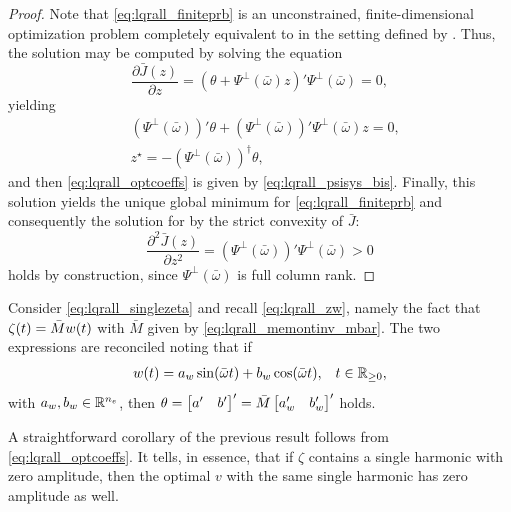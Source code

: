 \begin{proof}
	Note that \eqref{eq:lqrall_finiteprb} is an unconstrained, finite-dimensional optimization problem completely equivalent to  in the setting defined by . Thus, the solution may be computed by solving the equation
	\begin{equation}
		\frac{\partial\bar{J}(z)}{\partial z} = \left(\theta + \Psi^{\perp}(\bar{\omega})z \right)'\Psi^{\perp}(\bar{\omega}) = 0,
	\end{equation}
	yielding
	\begin{align}
		 & \left(\Psi^{\perp}(\bar{\omega}) \right)'\theta + \left(\Psi^{\perp}(\bar{\omega}) \right)'\Psi^{\perp}(\bar{\omega})z = 0, \\
		 & z^\star = -\left(\Psi^{\perp}(\bar{\omega}) \right)^\dagger \theta,
	\end{align}
	and then \eqref{eq:lqrall_optcoeffs} is given by \eqref{eq:lqrall_psisys_bis}.
	Finally, this solution yields the unique global minimum for \eqref{eq:lqrall_finiteprb} and consequently the solution for  by the strict convexity of $\bar{J}$:
	\begin{equation}
		\frac{\partial^2\bar{J}(z)}{\partial z^2} = (\Psi^{\perp}(\bar{\omega}))'\Psi^{\perp}(\bar{\omega}) > 0
	\end{equation}
	holds by construction, since $\Psi^{\perp}(\bar{\omega})$ is full column rank.
\end{proof}

\begin{remark}
	\label{rmk:lqrall_mbar}
	Consider \eqref{eq:lqrall_singlezeta} and recall \eqref{eq:lqrall_zw}, namely the fact that $\zeta(t) = \bar{M}w(t)$ with $\bar{M}$ given by \eqref{eq:lqrall_memontinv_mbar}. The two expressions are reconciled noting that if
	\begin{align}
		w(t) &= a_w \sin(\bar{\omega}t) + b_w \cos(\bar{\omega}t), & t\in\mathbb{R}_{\geq 0},
	\end{align}
	with $a_w,b_w\in\mathbb{R}^{n_e}$, then $\theta = \begin{bmatrix}a' & b'\end{bmatrix}' = \bar{M}\begin{bmatrix}a_w' & b_w'\end{bmatrix}'$ holds.\closeremark
\end{remark}

A straightforward corollary of the previous result follows from \eqref{eq:lqrall_optcoeffs}. It tells, in essence, that if $\zeta$ contains a single harmonic with zero amplitude, then the optimal $v$ with the same single harmonic has zero amplitude as well.

